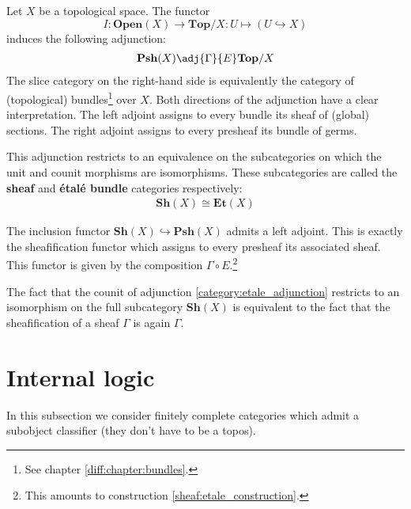	\begin{construct}
		Let $X$ be a topological space. The functor \[I:\textbf{Open}(X)\rightarrow\textbf{Top}/X:U\mapsto(U\hookrightarrow X)\] induces the following adjunction:
		\begin{gather}
			\label{category:etale_adjunction}
			\textbf{Psh}(X) \adj{\Gamma}{E} \textbf{Top}/X
		\end{gather}
		The slice category on the right-hand side is equivalently the category of (topological) bundles\footnote{See chapter \ref{diff:chapter:bundles}.} over $X$. Both directions of the adjunction have a clear interpretation. The left adjoint assigns to every bundle its sheaf of (global) sections. The right adjoint assigns to every presheaf its bundle of germs.
		
		This adjunction restricts to an equivalence on the subcategories on which the unit and counit morphisms are isomorphisms. These subcategories are called the \textbf{sheaf} and \textbf{\'etal\'e bundle} categories respectively:
		\begin{gather}
			\textbf{Sh}(X) \cong \textbf{Et}(X)
		\end{gather}
	\end{construct}
	
	\begin{property}
		The inclusion functor $\textbf{Sh}(X)\hookrightarrow\textbf{Psh}(X)$ admits a left adjoint. This is exactly the sheafification functor which assigns to every presheaf its associated sheaf. This functor is given by the composition $\Gamma\circ E$.\footnote{This amounts to construction \ref{sheaf:etale_construction}.}
		
		The fact that the counit of adjunction \ref{category:etale_adjunction} restricts to an isomorphism on the full subcategory $\textbf{Sh}(X)$ is equivalent to the fact that the sheafification of a sheaf $\Gamma$ is again $\Gamma$.
	\end{property}

	
\section{Internal logic}\label{cat:internal_logic}

	In this subsection we consider finitely complete categories which admit a subobject classifier (they don't have to be a topos).
	
	
